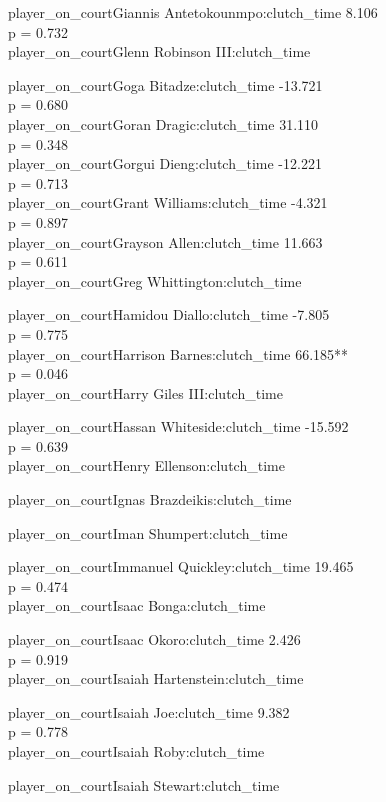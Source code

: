 \documentclass[
  landscape]{article}
\begin{document}
player\_on\_courtGiannis Antetokounmpo:clutch\_time 8.106\\
p = 0.732\\
player\_on\_courtGlenn Robinson III:clutch\_time

player\_on\_courtGoga Bitadze:clutch\_time -13.721\\
p = 0.680\\
player\_on\_courtGoran Dragic:clutch\_time 31.110\\
p = 0.348\\
player\_on\_courtGorgui Dieng:clutch\_time -12.221\\
p = 0.713\\
player\_on\_courtGrant Williams:clutch\_time -4.321\\
p = 0.897\\
player\_on\_courtGrayson Allen:clutch\_time 11.663\\
p = 0.611\\
player\_on\_courtGreg Whittington:clutch\_time

player\_on\_courtHamidou Diallo:clutch\_time -7.805\\
p = 0.775\\
player\_on\_courtHarrison Barnes:clutch\_time 66.185**\\
p = 0.046\\
player\_on\_courtHarry Giles III:clutch\_time

player\_on\_courtHassan Whiteside:clutch\_time -15.592\\
p = 0.639\\
player\_on\_courtHenry Ellenson:clutch\_time

player\_on\_courtIgnas Brazdeikis:clutch\_time

player\_on\_courtIman Shumpert:clutch\_time

player\_on\_courtImmanuel Quickley:clutch\_time 19.465\\
p = 0.474\\
player\_on\_courtIsaac Bonga:clutch\_time

player\_on\_courtIsaac Okoro:clutch\_time 2.426\\
p = 0.919\\
player\_on\_courtIsaiah Hartenstein:clutch\_time

player\_on\_courtIsaiah Joe:clutch\_time 9.382\\
p = 0.778\\
player\_on\_courtIsaiah Roby:clutch\_time

player\_on\_courtIsaiah Stewart:clutch\_time
\end{document}
